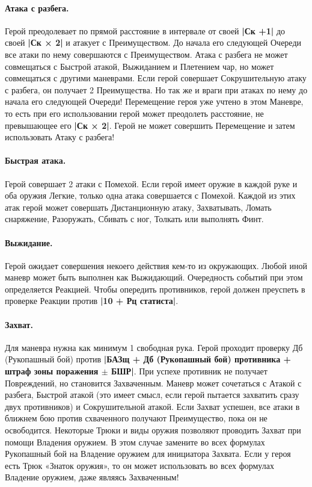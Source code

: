 \paragraph{Атака с разбега.} Герой преодолевает по прямой расстояние в интервале от своей \textbf{|Ск +1|} до своей \textbf{|Ск × 2|} и атакует с Преимуществом. До начала его следующей Очереди все атаки по нему совершаются с Преимуществом. Атака с разбега не может совмещаться с Быстрой атакой, Выжиданием и Плетением чар, но может совмещаться с другими маневрами. Если герой совершает Сокрушительную атаку с разбега, он получает
2 Преимущества. Но так же и враги при атаках по нему до начала его следующей Очереди!
\newline
Перемещение героя уже учтено в этом Маневре, то есть при его использовании герой может преодолеть расстояние, не превышающее его \textbf{|Ск × 2|}. Герой не может совершить Перемещение и затем использовать Атаку с разбега!
\paragraph{Быстрая атака.} Герой совершает 2 атаки с Помехой. Если герой имеет оружие в каждой руке и оба оружия Легкие, только одна атака совершается с Помехой. Каждой из этих атак герой может совершать Дистанционную атаку, Захватывать, Ломать снаряжение, Разоружать, Сбивать с ног, Толкать или выполнять Финт.
\paragraph{Выжидание.} Герой ожидает совершения некоего действия кем-то из окружающих. Любой иной маневр может быть выполнен как Выжидающий.
\newline
Очередность событий при этом определяется Реакцией. Чтобы
опередить противников, герой должен преуспеть в проверке
Реакции против \textbf{|10 + Рц статиста|}.
\paragraph{Захват.} Для маневра нужна как минимум 1 свободная рука. Герой проходит проверку Дб (Рукопашный бой) против \textbf{|БАЗщ + Дб (Рукопашный бой) противника + штраф зоны поражения $\pm$ БШР|}. При успехе противник не получает Повреждений, но становится Захваченным. Маневр может сочетаться с Атакой с разбега, Быстрой атакой (это имеет смысл, если герой пытается захватить сразу двух
противников) и Сокрушительной атакой. Если Захват успешен, все атаки в ближнем бою против схваченного получают Преимущество, пока он не освободится. Некоторые Трюки и виды оружия позволяют проводить Захват при помощи Владения оружием. В этом случае замените во всех формулах Рукопашный бой на Владение оружием для инициатора Захвата. Если у героя есть Трюк «Знаток оружия», то он может использовать во всех формулах Владение оружием, даже являясь Захваченным!
